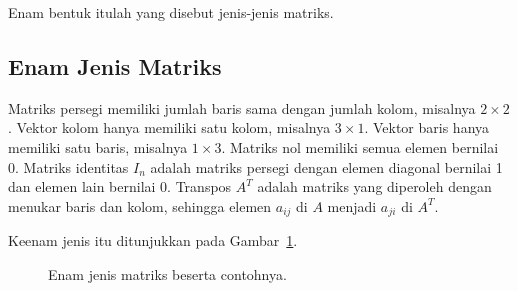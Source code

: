 \documentclass[11pt,a4paper]{article}
\begin{document}
Enam bentuk itulah yang disebut jenis-jenis matriks.

\subsection{Enam Jenis Matriks}

Matriks persegi memiliki jumlah baris sama dengan jumlah kolom, misalnya $2 \times 2$. Vektor kolom hanya memiliki satu kolom, misalnya $3 \times 1$. Vektor baris hanya memiliki satu baris, misalnya $1 \times 3$. Matriks nol memiliki semua elemen bernilai 0. Matriks identitas $I_n$ adalah matriks persegi dengan elemen diagonal bernilai 1 dan elemen lain bernilai 0. Transpos $A^T$ adalah matriks yang diperoleh dengan menukar baris dan kolom, sehingga elemen $a_{ij}$ di $A$ menjadi $a_{ji}$ di $A^T$.

Keenam jenis itu ditunjukkan pada Gambar~\ref{fig:jenis-matriks}.

\begin{figure}[H]
	\centering
	\caption{Enam jenis matriks beserta contohnya.}
	\label{fig:jenis-matriks}
\end{figure}
\end{document}
